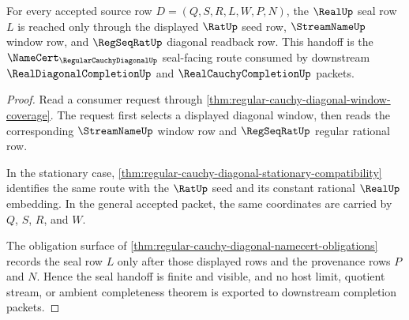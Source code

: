 \begin{theorem}
\label{thm:regular-cauchy-diagonal-real-seal-handoff}
For every accepted source row $D=(Q,S,R,L,W,P,N)$, the $\RealUp$ seal row $L$ is reached only through the displayed $\RatUp$ seed row, $\StreamNameUp$ window row, and $\RegSeqRatUp$ diagonal readback row. This handoff is the $\NameCert_{\RegularCauchyDiagonalUp}$ seal-facing route consumed by downstream $\RealDiagonalCompletionUp$ and $\RealCauchyCompletionUp$ packets.
\end{theorem}
\begin{proof}
Read a consumer request through \autoref{thm:regular-cauchy-diagonal-window-coverage}. The request first selects a displayed diagonal window, then reads the corresponding $\StreamNameUp$ window row and $\RegSeqRatUp$ regular rational row.

In the stationary case, \autoref{thm:regular-cauchy-diagonal-stationary-compatibility} identifies the same route with the $\RatUp$ seed and its constant rational $\RealUp$ embedding. In the general accepted packet, the same coordinates are carried by $Q$, $S$, $R$, and $W$.

The obligation surface of \autoref{thm:regular-cauchy-diagonal-namecert-obligations} records the seal row $L$ only after those displayed rows and the provenance rows $P$ and $N$. Hence the seal handoff is finite and visible, and no host limit, quotient stream, or ambient completeness theorem is exported to downstream completion packets.
\end{proof}

